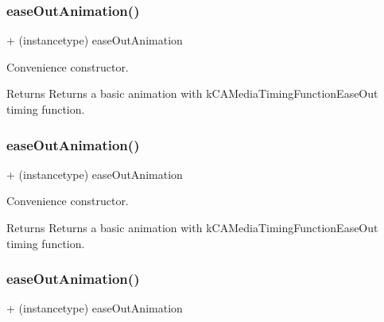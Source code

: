 \subsubsection{\texorpdfstring{ease\+Out\+Animation()}{easeOutAnimation()}\hspace{0.1cm}{\footnotesize\ttfamily [1/3]}}
{\footnotesize\ttfamily + (instancetype) ease\+Out\+Animation \begin{DoxyParamCaption}{ }\end{DoxyParamCaption}}

Convenience constructor. \begin{DoxyReturn}{Returns}
Returns a basic animation with k\+C\+A\+Media\+Timing\+Function\+Ease\+Out timing function. 
\end{DoxyReturn}
\mbox{\label{interface_p_o_p_basic_animation_acc9d80c152ce8a12051fb83487bed541}} 
\subsubsection{\texorpdfstring{ease\+Out\+Animation()}{easeOutAnimation()}\hspace{0.1cm}{\footnotesize\ttfamily [2/3]}}
{\footnotesize\ttfamily + (instancetype) ease\+Out\+Animation \begin{DoxyParamCaption}{ }\end{DoxyParamCaption}}

Convenience constructor. \begin{DoxyReturn}{Returns}
Returns a basic animation with k\+C\+A\+Media\+Timing\+Function\+Ease\+Out timing function. 
\end{DoxyReturn}
\mbox{\label{interface_p_o_p_basic_animation_acc9d80c152ce8a12051fb83487bed541}} 
\subsubsection{\texorpdfstring{ease\+Out\+Animation()}{easeOutAnimation()}\hspace{0.1cm}{\footnotesize\ttfamily [3/3]}}
{\footnotesize\ttfamily + (instancetype) ease\+Out\+Animation \begin{DoxyParamCaption}{ }\end{DoxyParamCaption}}

